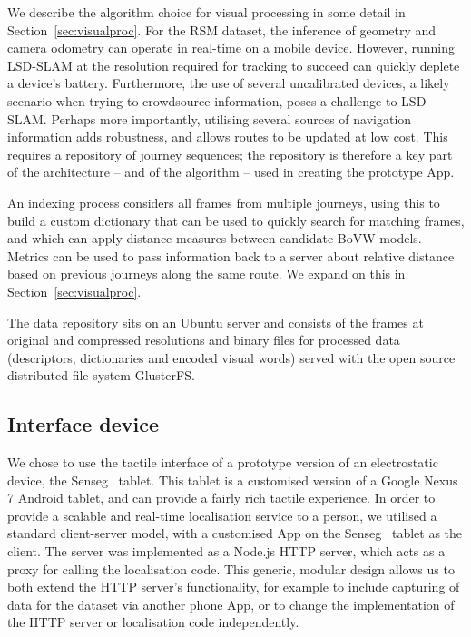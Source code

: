 We describe the algorithm choice for visual processing in some detail in Section~\ref{sec:visualproc}.  For the RSM dataset, the inference of geometry and camera odometry can operate in real-time on a mobile device. However, running LSD-SLAM at the resolution required for tracking to succeed can quickly deplete a device's battery.  Furthermore, the use of several uncalibrated devices, a likely scenario when trying to crowdsource information, poses a challenge to LSD-SLAM. Perhaps more importantly, utilising several sources of navigation information adds robustness, and allows routes to be updated at low cost. This requires a repository of journey sequences; the repository is therefore a key part of the architecture -- and of the algorithm -- used in creating the prototype App. 

An indexing process considers all frames from multiple journeys, using this to build a custom dictionary that can be used to quickly search for matching frames, and which can apply distance measures between candidate BoVW models. Metrics can be used to pass information back to a server about relative distance based on previous journeys along the same route.  We expand on this in Section~\ref{sec:visualproc}. 

The data repository sits on an Ubuntu server and consists of the frames at original and compressed resolutions and binary files for processed data (descriptors, dictionaries and encoded visual words) served with the open source distributed file system GlusterFS.

\subsection{Interface device} We chose to use the tactile interface of a prototype version of an electrostatic device, the Senseg\texttrademark~ tablet. This tablet is a customised version of a Google Nexus 7 Android tablet, and can provide a fairly rich tactile experience. In order to provide a scalable and real-time localisation service to a person, we utilised a standard client-server model, with a customised App on the Senseg\texttrademark~ tablet as the client. The server was implemented as a Node.js HTTP server, which acts as a proxy for calling the localisation code. This generic, modular design allows us to both extend the HTTP server's functionality, for example to include capturing of data for the dataset via another phone App, or to change the implementation of the HTTP server or localisation code independently.

